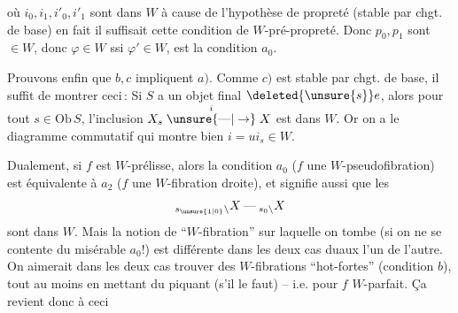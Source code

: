 où $i_0,i_1,i'_0,i'_1$ sont dans $W$ à cause de l'hypothèse de propreté (stable par chgt. de base) en fait il suffisait  cette condition de $W$-pré-propreté. Donc $p_0,p_1$ sont $\in W$, donc $\varphi\in W$ ssi $\varphi'\in W$,   est la condition $a_0$.


Prouvons enfin que $b,c$ impliquent $a)$. Comme $c)$  est stable par chgt. de base, il suffit de montrer ceci\,: Si $S$ a un objet final $\deleted{\unsure{s}}e$, alors pour tout $s\in\mathrm{Ob}\,S$, l'inclusion $X_s\mathrel{\overset{i}{\unsure{\text{---}|\to}}}X$ est dans $W$. Or on a le diagramme commutatif
qui montre bien $i=ui_s\in W$.

 Dualement, si $f$ est $W$-prélisse, alors   la condition $a_0$ ($f$ une $W$-pseudofibration) est équivalente à $a_2$ ($f$ une $W$-fibration droite), et signifie aussi que les
\[
{}_{s_{\unsure{1|0}}\backslash}X\mathbin{\text{---}}{}_{s_0\backslash}X
\]
sont dans $W$. Mais la notion de ``$W$-fibration'' sur laquelle on tombe (si on ne se contente du misérable $a_0$!) est différente dans les deux cas duaux l'un de l'autre. On aimerait dans les deux cas trouver des $W$-fibrations ``hot-fortes'' (condition $b$), tout au moins en mettant du piquant (s'il le faut) -- i.e. pour $f$ $W$-parfait. Ça revient donc à ceci

